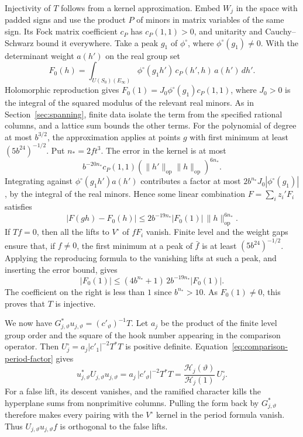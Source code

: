 Injectivity of \(T\) follows from a kernel approximation. Embed \(W_j\)
in the space with padded signs and use the product \(P\) of minors in
matrix variables of the same sign. Its Fock matrix coefficient \(c_P\)
has \(c_P(1,1)>0\), and unitarity and Cauchy--Schwarz bound it everywhere.
Take a peak \(g_1\) of \(\phi^\circ\), where \(\phi^\circ(g_1)\ne0\).
With the determinant weight \(a(h')\) on the real group set
\[
 F_0(h)=\int_{U(S_0)(E_\infty)}
            \phi^\circ(g_1h')\,c_P(h',h)\,a(h')\,dh'.
\]
Holomorphic reproduction gives \(F_0(1)=J_0\phi^\circ(g_1)c_P(1,1)\),
where \(J_0>0\) is the integral of the squared modulus of the relevant
real minors. As in Section~\ref{sec:spanning}, finite data isolate the
term from the specified rational columns, and a lattice sum bounds
the other terms. For the polynomial of degree at most \(b^{3/2}\),
the approximation applies at points \(g\) with first minimum at least
\((5b^{24})^{-1/2}\). Put \(n_*=2ft^3\). The error in the kernel is at most
\[
 b^{-20n_*}c_P(1,1)(\|h'\|_{\mathrm{op}}\|h\|_{\mathrm{op}})^{6n_*}.
\]
Integrating against \(\phi^\circ(g_1h')a(h')\) contributes a factor
at most \(2b^{n_*}J_0|\phi^\circ(g_1)|\), by the integral of the real minors.
Hence some linear combination \(F=\sum_i z_i' F_i\) satisfies
\[
 |F(gh)-F_0(h)|\le 2b^{-19n_*}|F_0(1)|\,\|h\|_{\mathrm{op}}^{6n_*}.
\]
If \(Tf=0\), then all the lifts to \(V^\circ\) of \(fF_i\) vanish.
Finite level and the weight gaps ensure that, if \(f\ne0\), the first
minimum at a peak of \(\bar f\) is at least \((5b^{24})^{-1/2}\).
Applying the reproducing formula to the vanishing lifts at such a peak,
and inserting the error bound, gives
\[
 |F_0(1)|\le (4b^{n_*}+1)\,2b^{-19n_*}|F_0(1)|.
\]
The coefficient on the right is less than \(1\) since \(b^{n_*}>10\).
As \(F_0(1)\ne0\), this proves that \(T\) is injective.

We now have \(G_{j,\vartheta}^*u_{j,\vartheta}=(c'_\vartheta)^{-1}T\).
Let \(a_j\) be the product of the finite level group order and the square
of the hook number appearing in the comparison operator.
Then \(U_j^\circ=a_j|c'_1|^{-2}T^*T\) is positive definite.
Equation~\eqref{eq:comparison-period-factor} gives
\[
 u_{j,\vartheta}^*U_{j,\vartheta}u_{j,\vartheta}
   =a_j\,|c'_\vartheta|^{-2}T^*T
   =\frac{\mathcal H_j(\vartheta)}{\mathcal H_j(1)}\,U_j^\circ .
\]
For a false lift, its descent vanishes, and the ramified character kills
the hyperplane sums from nonprimitive columns. Pulling the form back by
\(G_{j,\vartheta}^*\) therefore makes every pairing with the \(V^\circ\)
kernel in the period formula vanish. Thus \(U_{j,\vartheta}u_{j,\vartheta} f\)
is orthogonal to the false lifts.
